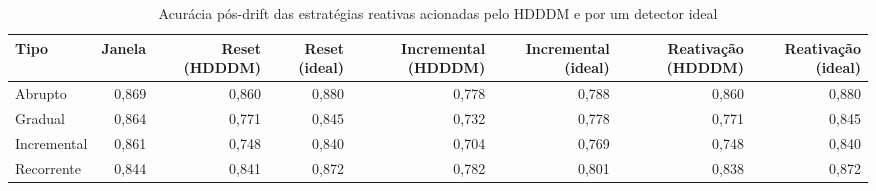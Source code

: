 \begin{table}[htbp]
\centering
\small
\caption{Acurácia pós-drift das estratégias reativas acionadas pelo HDDDM e por um detector ideal}
\label{tab:detector-ideal}
\begin{adjustbox}{max width=\textwidth}
\begin{tabular}{lrrrrrrr}
\toprule
Tipo & Janela & Reset (HDDDM) & Reset (ideal) & Incremental (HDDDM) & Incremental (ideal) & Reativação (HDDDM) & Reativação (ideal) \\
\midrule
Abrupto & 0,869 & 0,860 & 0,880 & 0,778 & 0,788 & 0,860 & 0,880 \\
Gradual & 0,864 & 0,771 & 0,845 & 0,732 & 0,778 & 0,771 & 0,845 \\
Incremental & 0,861 & 0,748 & 0,840 & 0,704 & 0,769 & 0,748 & 0,840 \\
Recorrente & 0,844 & 0,841 & 0,872 & 0,782 & 0,801 & 0,838 & 0,872 \\
\bottomrule
\end{tabular}
\end{adjustbox}
\par\vspace{2pt}{\footnotesize Médias sobre severidades, classificadores e repetições. Detector ideal: um acionamento no primeiro bloco após o fim de cada transição verdadeira.}
\end{table}
